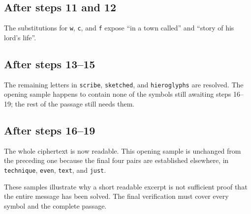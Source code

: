 \subsection{After steps 11 and 12}
The substitutions for \texttt{w}, \texttt{c}, and \texttt{f} expose ``in a town called'' and ``story of his lord's life''.

\subsection{After steps 13--15}
The remaining letters in \texttt{scribe}, \texttt{sketched}, and \texttt{hieroglyphs} are resolved. The opening sample happens to contain none of the symbols still awaiting steps 16--19; the rest of the passage still needs them.

\subsection{After steps 16--19}
The whole ciphertext is now readable. This opening sample is unchanged from the preceding one because the final four pairs are established elsewhere, in \texttt{technique}, \texttt{even}, \texttt{text}, and \texttt{just}.

These samples illustrate why a short readable excerpt is not sufficient proof that the entire message has been solved. The final verification must cover every symbol and the complete passage.
